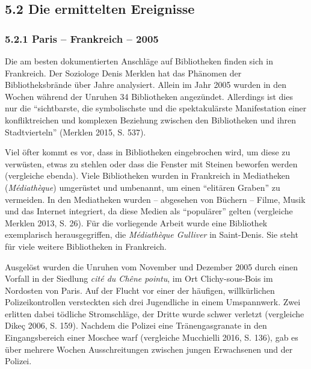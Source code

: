 \documentclass[a4paper,
fontsize=11pt,
oneside,
numbers=noperiodatend,
parskip=half-,
bibliography=totoc,
final
]{scrartcl}
\begin{document}
\hypertarget{die-ermittelten-ereignisse}{%
\subsection{5.2 Die ermittelten
Ereignisse}\label{die-ermittelten-ereignisse}}

\hypertarget{paris-frankreich-2005}{%
\subsubsection{5.2.1 Paris -- Frankreich --
2005}\label{paris-frankreich-2005}}

Die am besten dokumentierten Anschläge auf Bibliotheken finden sich in
Frankreich. Der Soziologe Denis Merklen hat das Phänomen der
Bibliotheksbrände über Jahre analysiert. Allein im Jahr 2005 wurden in
den Wochen während der Unruhen 34 Bibliotheken angezündet. Allerdings
ist dies nur die \enquote{sichtbarste, die symbolischste und die
spektakulärste Manifestation einer konfliktreichen und komplexen
Beziehung zwischen den Bibliotheken und ihren Stadtvierteln} (Merklen
2015, S. 537).

Viel öfter kommt es vor, dass in Bibliotheken eingebrochen wird, um
diese zu verwüsten, etwas zu stehlen oder dass die Fenster mit Steinen
beworfen werden (vergleiche ebenda). Viele Bibliotheken wurden in
Frankreich in Mediatheken (\emph{Médiathèque}) umgerüstet und umbenannt,
um einen \enquote{elitären Graben} zu vermeiden. In den Mediatheken
wurden -- abgesehen von Büchern -- Filme, Musik und das Internet
integriert, da diese Medien als \enquote{populärer} gelten (vergleiche
Merklen 2013, S. 26). Für die vorliegende Arbeit wurde eine Bibliothek
exemplarisch herausgegriffen, die \emph{Médiathèque Gulliver} in
Saint-Denis. Sie steht für viele weitere Bibliotheken in Frankreich.

Ausgelöst wurden die Unruhen vom November und Dezember 2005 durch einen
Vorfall in der Siedlung \emph{cité du Chêne pointu}, im Ort
Clichy-sous-Bois im Nordosten von Paris. Auf der Flucht vor einer der
häufigen, willkürlichen Polizeikontrollen versteckten sich drei
Jugendliche in einem Umspannwerk. Zwei erlitten dabei tödliche
Stromschläge, der Dritte wurde schwer verletzt (vergleiche Dikeç 2006,
S. 159). Nachdem die Polizei eine Tränengasgranate in den
Eingangsbereich einer Moschee warf (vergleiche Mucchielli 2016, S. 136),
gab es über mehrere Wochen Ausschreitungen zwischen jungen Erwachsenen
und der Polizei.
\end{document}
